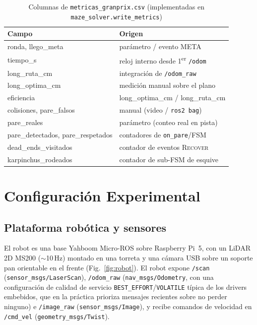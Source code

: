 \documentclass[conference]{IEEEtran}
\begin{document}
\begin{table}[t]
\centering
\caption{Columnas de \texttt{metricas\_granprix.csv} (implementadas en \texttt{maze\_solver.write\_metrics})}
\label{tab:metrics}
\small
\begin{tabular}{@{}ll@{}}
\toprule
\textbf{Campo} & \textbf{Origen} \\
\midrule
ronda, llego\_meta & parámetro / evento META \\
tiempo\_s & reloj interno desde 1\textsuperscript{er} \texttt{/odom} \\
long\_ruta\_cm & integración de \texttt{/odom\_raw} \\
long\_optima\_cm & medición manual sobre el plano \\
eficiencia & long\_optima\_cm / long\_ruta\_cm \\
colisiones, pare\_falsos & manual (video / \texttt{ros2 bag}) \\
pare\_reales & parámetro (conteo real en pista) \\
pare\_detectados, pare\_respetados & contadores de \texttt{on\_pare}/FSM \\
dead\_ends\_visitados & contador de eventos \textsc{Recover} \\
karpinchus\_rodeados & contador de sub-FSM de esquive \\
\bottomrule
\end{tabular}
\end{table}

\section{Configuración Experimental}

\subsection{Plataforma robótica y sensores}
El robot es una base Yahboom Micro-ROS sobre Raspberry Pi~5, con un LiDAR 2D MS200 ($\sim$10\,Hz) montado en una torreta y una cámara USB sobre un soporte pan orientable en el frente (Fig.~\ref{fig:robot}). El robot expone \texttt{/scan} (\texttt{sensor\_msgs/LaserScan}), \texttt{/odom\_raw} (\texttt{nav\_msgs/Odometry}, con una configuración de calidad de servicio \texttt{BEST\_EFFORT}/\texttt{VOLATILE} típica de los drivers embebidos, que en la práctica prioriza mensajes recientes sobre no perder ninguno) e \texttt{/image\_raw} (\texttt{sensor\_msgs/Image}), y recibe comandos de velocidad en \texttt{/cmd\_vel} (\texttt{geometry\_msgs/Twist}).
\end{document}
